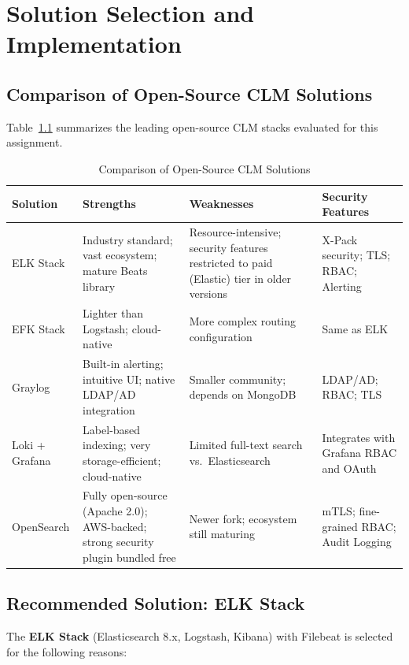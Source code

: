 \documentclass[12pt,a4paper]{report}
\begin{document}
\chapter{Solution Selection and Implementation}
\label{chap:impl}

\section{Comparison of Open-Source CLM Solutions}

Table~\ref{tab:solutions} summarizes the leading open-source CLM stacks evaluated for
this assignment.

\begin{table}[H]
\centering
\caption{Comparison of Open-Source CLM Solutions}
\label{tab:solutions}
\begin{tabularx}{\textwidth}{lXXX}
\toprule
\textbf{Solution} & \textbf{Strengths} & \textbf{Weaknesses} & \textbf{Security Features} \\
\midrule
ELK Stack
  & Industry standard; vast ecosystem; mature Beats library
  & Resource-intensive; security features restricted to paid (Elastic) tier in older versions
  & X-Pack security; TLS; RBAC; Alerting \\
\addlinespace
EFK Stack
  & Lighter than Logstash; cloud-native
  & More complex routing configuration
  & Same as ELK \\
\addlinespace
Graylog
  & Built-in alerting; intuitive UI; native LDAP/AD integration
  & Smaller community; depends on MongoDB
  & LDAP/AD; RBAC; TLS \\
\addlinespace
Loki + Grafana
  & Label-based indexing; very storage-efficient; cloud-native
  & Limited full-text search vs.\ Elasticsearch
  & Integrates with Grafana RBAC and OAuth \\
\addlinespace
OpenSearch
  & Fully open-source (Apache 2.0); AWS-backed; strong security plugin bundled free
  & Newer fork; ecosystem still maturing
  & mTLS; fine-grained RBAC; Audit Logging \\
\bottomrule
\end{tabularx}
\end{table}

\section{Recommended Solution: ELK Stack}

The \textbf{ELK Stack} (Elasticsearch 8.x, Logstash, Kibana) with Filebeat is selected
for the following reasons:
\end{document}
